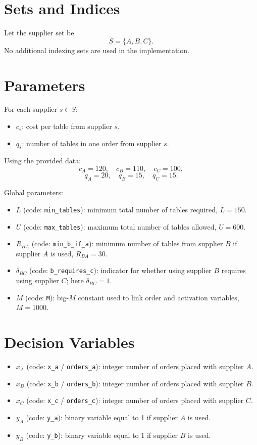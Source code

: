 \section*{Sets and Indices}

Let the supplier set be
\[
S=\{A,B,C\}.
\]
No additional indexing sets are used in the implementation.

\section*{Parameters}

For each supplier \(s\in S\):
\begin{itemize}
    \item \(c_s\): cost per table from supplier \(s\).
    \item \(q_s\): number of tables in one order from supplier \(s\).
\end{itemize}

Using the provided data:
\[
c_A=120,\quad c_B=110,\quad c_C=100,
\]
\[
q_A=20,\quad q_B=15,\quad q_C=15.
\]

Global parameters:
\begin{itemize}
    \item \(L\) (code: \texttt{min\_tables}): minimum total number of tables required, \(L=150\).
    \item \(U\) (code: \texttt{max\_tables}): maximum total number of tables allowed, \(U=600\).
    \item \(R_{BA}\) (code: \texttt{min\_b\_if\_a}): minimum number of tables from supplier \(B\) if supplier \(A\) is used, \(R_{BA}=30\).
    \item \(\delta_{BC}\) (code: \texttt{b\_requires\_c}): indicator for whether using supplier \(B\) requires using supplier \(C\); here \(\delta_{BC}=1\).
    \item \(M\) (code: \texttt{M}): big-\(M\) constant used to link order and activation variables, \(M=1000\).
\end{itemize}

\section*{Decision Variables}

\begin{itemize}
    \item \(x_A\) (code: \texttt{x\_a} / \texttt{orders\_a}): integer number of orders placed with supplier \(A\).
    \item \(x_B\) (code: \texttt{x\_b} / \texttt{orders\_b}): integer number of orders placed with supplier \(B\).
    \item \(x_C\) (code: \texttt{x\_c} / \texttt{orders\_c}): integer number of orders placed with supplier \(C\).
    \item \(y_A\) (code: \texttt{y\_a}): binary variable equal to 1 if supplier \(A\) is used.
    \item \(y_B\) (code: \texttt{y\_b}): binary variable equal to 1 if supplier \(B\) is used.
\end{itemize}


